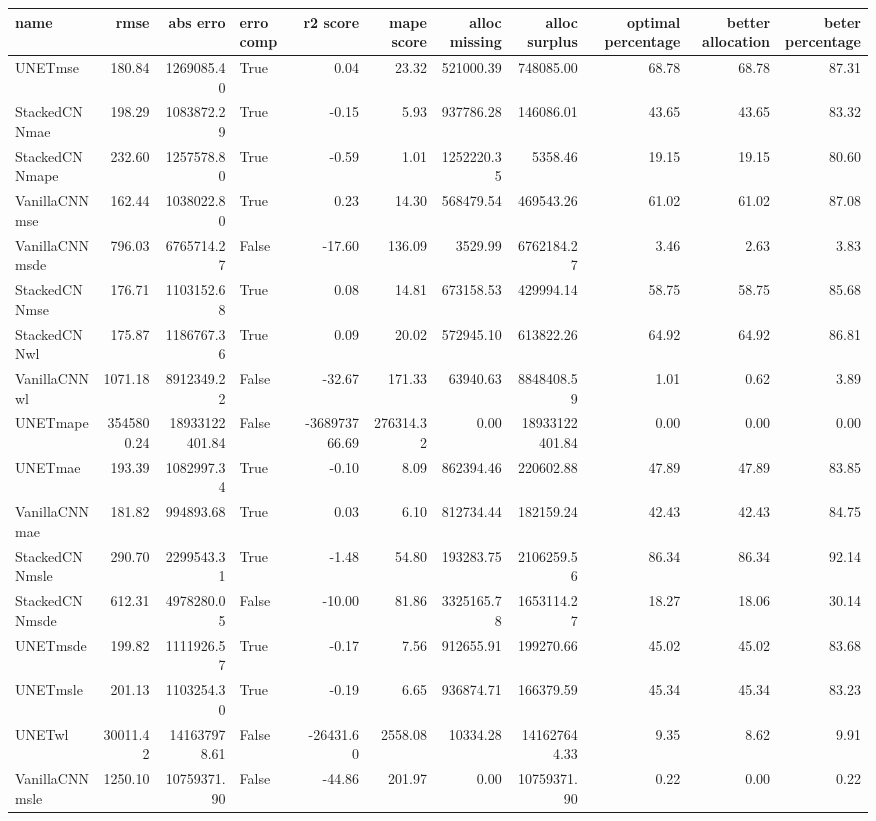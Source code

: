 \begin{tabular}{lrrlrrrrrrr}
\toprule
name & rmse & abs erro & erro comp & r2 score & mape score & alloc missing & alloc surplus & optimal percentage & better allocation & beter percentage \\
\midrule
UNETmse & 180.84 & 1269085.40 & True & 0.04 & 23.32 & 521000.39 & 748085.00 & 68.78 & 68.78 & 87.31 \\
StackedCNNmae & 198.29 & 1083872.29 & True & -0.15 & 5.93 & 937786.28 & 146086.01 & 43.65 & 43.65 & 83.32 \\
StackedCNNmape & 232.60 & 1257578.80 & True & -0.59 & 1.01 & 1252220.35 & 5358.46 & 19.15 & 19.15 & 80.60 \\
VanillaCNNmse & 162.44 & 1038022.80 & True & 0.23 & 14.30 & 568479.54 & 469543.26 & 61.02 & 61.02 & 87.08 \\
VanillaCNNmsde & 796.03 & 6765714.27 & False & -17.60 & 136.09 & 3529.99 & 6762184.27 & 3.46 & 2.63 & 3.83 \\
StackedCNNmse & 176.71 & 1103152.68 & True & 0.08 & 14.81 & 673158.53 & 429994.14 & 58.75 & 58.75 & 85.68 \\
StackedCNNwl & 175.87 & 1186767.36 & True & 0.09 & 20.02 & 572945.10 & 613822.26 & 64.92 & 64.92 & 86.81 \\
VanillaCNNwl & 1071.18 & 8912349.22 & False & -32.67 & 171.33 & 63940.63 & 8848408.59 & 1.01 & 0.62 & 3.89 \\
UNETmape & 3545800.24 & 18933122401.84 & False & -368973766.69 & 276314.32 & 0.00 & 18933122401.84 & 0.00 & 0.00 & 0.00 \\
UNETmae & 193.39 & 1082997.34 & True & -0.10 & 8.09 & 862394.46 & 220602.88 & 47.89 & 47.89 & 83.85 \\
VanillaCNNmae & 181.82 & 994893.68 & True & 0.03 & 6.10 & 812734.44 & 182159.24 & 42.43 & 42.43 & 84.75 \\
StackedCNNmsle & 290.70 & 2299543.31 & True & -1.48 & 54.80 & 193283.75 & 2106259.56 & 86.34 & 86.34 & 92.14 \\
StackedCNNmsde & 612.31 & 4978280.05 & False & -10.00 & 81.86 & 3325165.78 & 1653114.27 & 18.27 & 18.06 & 30.14 \\
UNETmsde & 199.82 & 1111926.57 & True & -0.17 & 7.56 & 912655.91 & 199270.66 & 45.02 & 45.02 & 83.68 \\
UNETmsle & 201.13 & 1103254.30 & True & -0.19 & 6.65 & 936874.71 & 166379.59 & 45.34 & 45.34 & 83.23 \\
UNETwl & 30011.42 & 141637978.61 & False & -26431.60 & 2558.08 & 10334.28 & 141627644.33 & 9.35 & 8.62 & 9.91 \\
VanillaCNNmsle & 1250.10 & 10759371.90 & False & -44.86 & 201.97 & 0.00 & 10759371.90 & 0.22 & 0.00 & 0.22 \\
\bottomrule
\end{tabular}
